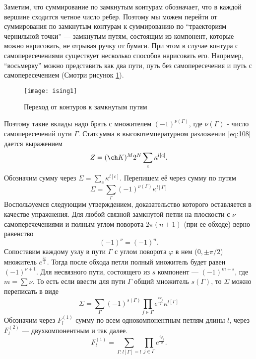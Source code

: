 \documentclass[a4paper,12pt]{article}
\theoremstyle{definition}
\theoremstyle{definition}
\theoremstyle{definition}
\begin{document}
Заметим, что суммирование по замкнутым контурам обозначает, что в каждой вершине сходится четное
число ребер. Поэтому мы можем перейти от суммирования по замкнутым контурам к суммированию по
``траекториям чернильной точки'' --- замкнутым путям, состоящим из компонент, которые можно
нарисовать, не отрывая ручку от бумаги. При этом в случае контура с самопересечениями существует
несколько способов нарисовать его. Например, ``восьмерку'' можно представить как два пути, путь без
самопересечения и путь с самопересечением (Смотри рисунок \ref{fig:ising-1}). 
\begin{figure}[h!tb]
  \centering
    \texttt{[image: ising1]}
  \caption{Переход от контуров к замкнутым путям}
  \label{fig:ising-1}
\end{figure}
Поэтому такие вклады надо брать с множителем $(-1)^{\nu(\Gamma)}$, где $\nu(\Gamma)$ - число
самопересечений пути $\Gamma$. 
Статсумма в высокотемпературном разложении \eqref{eq:108} дается выражением 
\begin{equation}
  \label{eq:113}
  Z=(\ch K)^M 2^N\sum_c \kappa^{l[c]}.
\end{equation}
Обозначим сумму через $\Sigma=\sum_c \kappa^{l[c]}$. Перепишем её через сумму по путям 
\begin{equation}
  \label{eq:114}
  \Sigma=\sum_{\Gamma}(-1)^{\nu(\Gamma)} \kappa^{l[\Gamma]}
\end{equation}
Воспользуемся следующим утверждением, доказательство которого оставляется в качестве упражнения. Для
любой связной замкнутой петли на плоскости с $\nu$ самоперечечениями и полным углом поворота
$2\pi(n+1)$ (при ее обходе) верно равенство 
\begin{equation}
  \label{eq:115}
  (-1)^{\nu}=(-1)^n.
\end{equation}
Сопоставим каждому узлу в пути $\Gamma$ с углом поворота $\varphi$ в нем ($0,\pm \pi/2$) множитель $e^{\frac{i\varphi}{2}}$. Тогда после обхода петли полный множитель будет равен $(-1)^{\nu+1}$. Для несвязного пути, состоящего из $s$ компонент --- $(-1)^{m+s}$, где $m=\sum \nu$. То есть если ввести для пути $\Gamma$ общий множитель $s(\Gamma)$, то $\Sigma$ можно переписать в виде
\begin{equation}
  \label{eq:116}
  \Sigma=\sum_{\Gamma}(-1)^{s(\Gamma)}\prod_{j\in \Gamma} e^{\frac{i\varphi_j}{2}}\kappa^{l[\Gamma]}
\end{equation}
Обозначим через $F^{(1)}_l$ сумму по всем однокомпонентным петлям длины $l$, через $F^{(2)}_l$ --- двухкомпонентным и так далее.
\begin{equation}
  \label{eq:117}
  F^{(1)}_l=\sum_{\Gamma:l[\Gamma]=l} \prod_{j\in \Gamma} e^{\frac{i\varphi_j}{2}}.
\end{equation}
\end{document}
